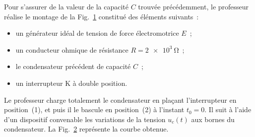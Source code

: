 Pour s'assurer de la valeur de la capacité $C$ trouvée précédemment, le
professeur réalise le montage de la
Fig.~\ref{fig:svt_national_2016_normale_phys_ex2_3} constitué des éléments
suivants~:

\begin{itemize}
    \item un générateur idéal de tension de force électromotrice $E$~;
    \item un conducteur ohmique de résistance $R=\qty{2e3}{\ohm}$~;
    \item le condensateur précédent de capacité $C$~;
    \item un interrupteur $\mathrm{K}$ à double position.
\end{itemize}

Le professeur charge totalement le condensateur en plaçant l'interrupteur en
position~(1), et puis il le bascule en position~(2) à l'instant $t_{0}=0$. Il
suit à l'aide d'un dispositif convenable les variations de la tension $u_{c}(t)$
aux bornes du condensateur.
La Fig.~\ref{fig:svt_national_2016_normale_phys_ex2_4} représente la courbe
obtenue.



\begin{minipage}{0.49\linewidth}
    \begin{figure}[H]
        \centering
        \caption{}
        \label{fig:svt_national_2016_normale_phys_ex2_3}
    \end{figure}
\end{minipage}
\hfill
\begin{minipage}{0.49\linewidth}
\begin{figure}[H]
    \centering
    \caption{}
    \label{fig:svt_national_2016_normale_phys_ex2_4}
\end{figure}
\end{minipage}


